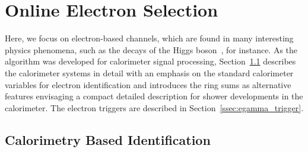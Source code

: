 \chapter{Online Electron Selection}\label{sec:context}



Here, we focus on electron-based channels, which are found in many interesting physics phenomena, such as the decays of the Higgs boson~\cite{HIGG-2012-27,HIGG-2016-33}, for instance.  As the \rnn{} algorithm was developed for calorimeter signal processing, Section~\ref{sec:atlas_trigger} describes the calorimeter systems in detail with an emphasis on the standard calorimeter variables for electron identification and introduces the ring sums as alternative features envisaging a compact detailed description for shower developments in the calorimeter. The electron triggers are described in Section~\ref{ssec:egamma_trigger}.

\section{Calorimetry Based Identification}\label{sec:atlas_trigger}

